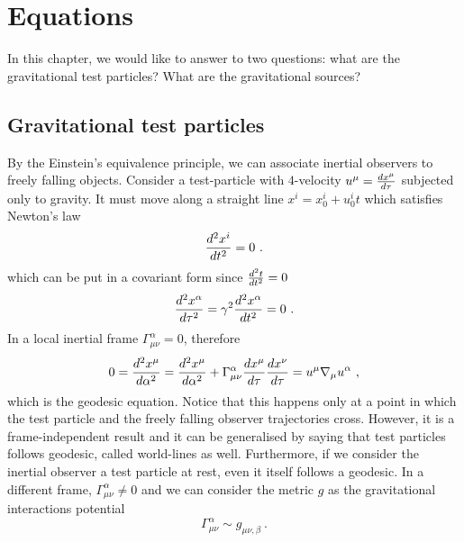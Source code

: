 \chapter{Equations}

    In this chapter, we would like to answer to two questions: what are the gravitational test particles? What are the gravitational sources?

\section{Gravitational test particles}

    By the Einstein's equivalence principle, we can associate inertial observers to freely falling objects. Consider a test-particle with $4$-velocity $u^\mu = \frac{dx^\mu}{d\tau}$ subjected only to gravity. It must move along a straight line $x^i = x^i_0 + u^i_0 t$ which satisfies Newton's law 
    \begin{equation*}
        \frac{d^2x^i}{dt^2} = 0 ~.
    \end{equation*}
    which can be put in a covariant form since $\frac{d^2t}{dt^2} = 0$ 
    \begin{equation*}
        \frac{d^2x^\alpha}{d\tau^2} = \gamma^2 \frac{d^2x^\alpha}{dt^2} = 0 ~.
    \end{equation*}
    In a local inertial frame $\Gamma^\alpha_{\mu\nu} = 0$, therefore 
    \begin{equation*}
        0 = \frac{d^2x^\mu}{d\alpha^2} = \frac{d^2x^\mu}{d\alpha^2} + \Gamma^\alpha_{\mu\nu} \frac{dx^\mu}{d\tau} \frac{dx^\nu}{d\tau} = u^\mu \nabla_\mu u^\alpha ~,
    \end{equation*}
    which is the geodesic equation. Notice that this happens only at a point in which the test particle and the freely falling observer trajectories cross. However, it is a frame-independent result and it can be generalised by saying that test particles follows geodesic, called world-lines as well. Furthermore, if we consider the inertial observer a test particle at rest, even it itself follows a geodesic. In a different frame, $\Gamma^\alpha_{\mu\nu} \neq 0$ and we can consider the metric $g$ as the gravitational interactions potential
    \begin{equation*}
        \Gamma^\alpha_{\mu\nu} \sim g_{\mu\nu,\beta} ~.
    \end{equation*}

